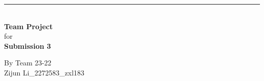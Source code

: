 \documentclass[a4paper]{article}
\begin{document}

\begin{titlepage}
	
	\rule{\linewidth}{5pt}
	\raggedleft
	\fontsize{38pt}{50pt}\selectfont
    \textbf{\\Team Project\\}
    \fontsize{28pt}{60pt}\selectfont 
    for\\
    \fontsize{38pt}{60pt}\selectfont 
    \textbf{Submission 3\\}
	
	\vfill %
	
	
	\parbox[t]{0.93\textwidth}{ %
		\raggedleft %
		\large %
		{\Large By Team 23-22}\\[4pt] %
		Zijun Li\_2272583\_zxl183\\
	}
	
\end{titlepage}
\newpage
\end{document}
